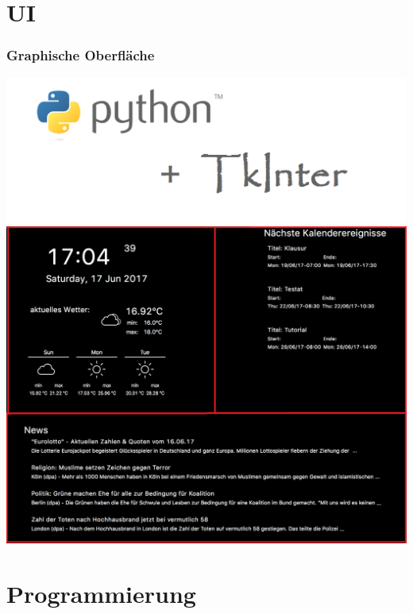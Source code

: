 \documentclass[11pt]{beamer}
\begin{document}
	\section{UI}
	\begin{frame}
		\frametitle{Graphische Oberfl\"ache}
		\begin{center}
			\includegraphics[scale=0.25]{images/python+tkinter.png}
			\linebreak
			\includegraphics[scale=0.12]{images/grafOberflaeche.png}
		\end{center}
	\end{frame}
		
	\section{Programmierung}
\end{document}
